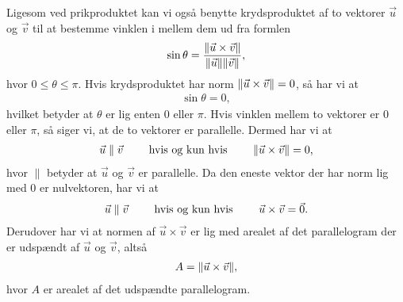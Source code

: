Ligesom ved prikproduktet kan vi også benytte krydsproduktet af to vektorer $\vec{u}$ og $\vec{v}$ til at bestemme vinklen i mellem dem ud fra formlen
\begin{align}\label{eq:vec3d1vinkelvedkrydsprodukt}
\sin \theta = \frac{\Vert \vec{u} \times \vec{v}\Vert}{\Vert \vec{u}\Vert\Vert \vec{v}\Vert},
\end{align}
hvor $0\leq\theta\leq\pi$. Hvis krydsproduktet har norm $\Vert \vec{u} \times \vec{v}\Vert=0$, så har vi at 
\begin{align*}
\sin \theta = 0,
\end{align*}
hvilket betyder at $\theta$ er lig enten $0$ eller $\pi$. Hvis vinklen mellem to vektorer er $0$ eller $\pi$, så siger vi, at de to vektorer er parallelle. Dermed har vi at 
\begin{align*}
\vec{u} \parallel \vec{v} \qquad \textup{ hvis og kun hvis } \qquad \Vert \vec{u} \times \vec{v}\Vert = 0,
\end{align*}
hvor $\parallel$ betyder at $\vec{u}$ og $\vec{v}$ er parallelle. Da den eneste vektor der har norm lig med $0$ er nulvektoren, har vi at
\begin{align*}
\vec{u} \parallel \vec{v} \qquad \textup{ hvis og kun hvis } \qquad \vec{u} \times \vec{v} = \vec{0}.
\end{align*}
Derudover har vi at normen af $\vec{u} \times \vec{v}$ er lig med arealet af det parallelogram der er udspændt af $\vec{u}$ og $\vec{v}$, altså
\begin{align*}
A = \Vert \vec{u} \times \vec{v}\Vert,
\end{align*}
hvor $A$ er arealet af det udspændte parallelogram.

